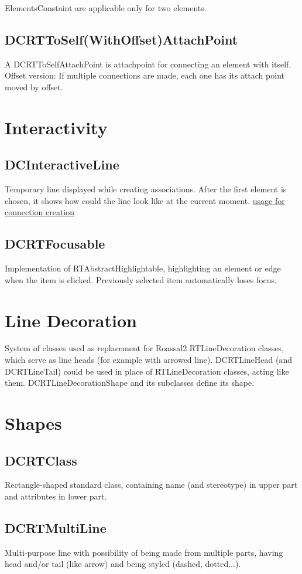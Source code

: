 \documentclass[a4paper,10pt,twoside]{book}
\begin{document}
ElementsConstaint are applicable only for two elements.
\subsection{ DCRTToSelf(WithOffset)AttachPoint}
A DCRTToSelfAttachPoint is attachpoint for connecting an element with itself.
Offset version: If multiple connections are made, each one has its attach point moved by offset.
\section{ Interactivity}\subsection{ DCInteractiveLine}
Temporary line displayed while creating associations. After the first element is chosen, it shows how could the line look like at the current moment.
\href{../figures/connection%20creation%20tool%20sequence.png}{usage for connection creation}
\subsection{ DCRTFocusable}
Implementation of RTAbstractHighlightable, highlighting an element or edge when the item is clicked. Previously selected item automatically loses focus.
\section{ Line Decoration}
System of classes used as replacement for Roassal2 RTLineDecoration classes, which serve as line heads (for example with arrowed line).
DCRTLineHead (and DCRTLineTail) could be used in place of RTLineDecoration classes, acting like them.
DCRTLineDecorationShape and its subclasses define its shape.
\section{ Shapes}\subsection{ DCRTClass}
Rectangle-shaped standard class, containing name (and stereotype) in upper part and attributes in lower part.
\subsection{ DCRTMultiLine}
Multi-purpose line with possibility of being made from multiple parts, having head and$/$or tail (like arrow) and being styled (dashed, dotted...).
\end{document}
